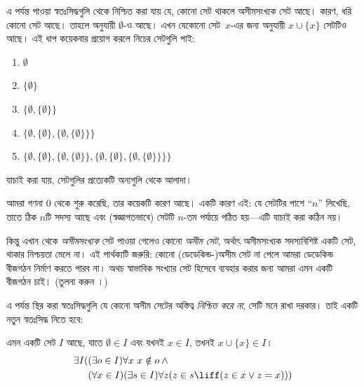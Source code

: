 \documentclass[../../../include/open-logic-section]{subfiles}
\begin{document}

এ পর্যন্ত পাওয়া স্বতঃসিদ্ধগুলি থেকে নিশ্চিত করা যায় যে, কোনো সেট
থাকলে অসীমসংখ্যক সেট আছে। কারণ, ধরি কোনো সেট আছে। তাহলে
 অনুযায়ী $\emptyset$-ও আছে।
এখন যেকোনো সেট~$x$-এর জন্য
 অনুযায়ী
$x \cup \{x\}$ সেটটিও আছে। এই ধাপ কয়েকবার প্রয়োগ করলে
নিচের সেটগুলি পাই:
\begin{enumerate}
	\item[0.] $\emptyset$ %
	\item[1.] $ \{\emptyset\}$ %
	\item[2.] $\{\emptyset, \{\emptyset\}\}$ %
	\item[3.] $\{\emptyset, \{\emptyset\}, \{\emptyset, \{\emptyset\}\}\}$ %
	\item[4.] $\{\emptyset, \{\emptyset\}, \{\emptyset, \{\emptyset\}\}, \{\emptyset, \{\emptyset\}, \{\emptyset, \{\emptyset\}\}\}\}$%
\end{enumerate}
যাচাই করা যায়, সেটগুলির প্রত্যেকটি অন্যগুলি থেকে আলাদা।

আমরা গণনা $0$ থেকে শুরু করেছি, তার কয়েকটি কারণ আছে। একটি
কারণ এই: যে সেটটির পাশে ``$n$'' লিখেছি, তাতে ঠিক $n$টি সদস্য
আছে এবং (স্বজ্ঞাগতভাবে) সেটটি $n$-তম পর্যায়ে গঠিত হয়—এটি
যাচাই করা কঠিন নয়।

কিন্তু এখান থেকে
\emph{অসীমসংখ্যক} সেট পাওয়া গেলেও কোনো
\emph{অসীম সেট}, অর্থাৎ অসীমসংখ্যক সদস্যবিশিষ্ট একটি সেট,
থাকার নিশ্চয়তা মেলে না। এই পার্থক্যটি জরুরি: কোনো
(ডেডেকিন্ড-)অসীম সেট না পেলে আমরা ডেডেকিন্ড বীজগঠন
নির্মাণ করতে পারব না। অথচ স্বাভাবিক সংখ্যার সেট হিসেবে
ব্যবহার করার জন্য আমরা এমন একটি বীজগঠন চাই।
(তুলনা করুন ।)

এ পর্যন্ত স্থির করা স্বতঃসিদ্ধগুলি যে কোনো অসীম সেটের
অস্তিত্ব
\emph{নিশ্চিত করে না}, সেটি মনে রাখা দরকার। তাই
একটি নতুন স্বতঃসিদ্ধ নিতে হবে:

\begin{axiom}[অসীমতা]
এমন একটি সেট $I$ আছে, যাতে $\emptyset \in I$ এবং
যখনই $x \in I$, তখনই $x \cup \{x\} \in I$।
\begin{align*}
	\exists I( & (\exists o \in I)\forall x\ x \notin o \land {}\\
	& (\forall x \in I)(\exists s \in I)\forall z(z \in s \liff (z \in x \lor z = x)))
\end{align*}
\end{axiom}
\end{document}
